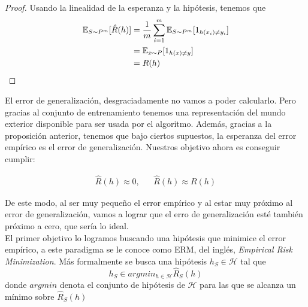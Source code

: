             \begin{proof}
            Usando la linealidad de la esperanza y la hipótesis, tenemos que 
            \begin{equation}
                \begin{aligned}
                    \mathbb{E}_{S \sim P^m} [\hat{R}(h)] & = \frac{1}{m}\sum_{i=1}^m \mathbb{E}_{S \sim P^m}[1_{h(x_i)\neq y_i}]  \\
                     & = \mathbb{E}_{x \sim P}[1_{h(x)\neq y}]  \\
                     & = R(h)
                \end{aligned}
            \end{equation}
            \end{proof}
        
        El error de generalización, desgraciadamente no vamos a poder calcularlo. Pero gracias al conjunto de entrenamiento tenemos una representación del mundo exterior disponible para ser usada por el algoritmo. Además, gracias a la proposición anterior, tenemos que bajo ciertos supuestos, la esperanza del error empírico es el error de generalización. Nuestros objetivo ahora es conseguir cumplir: 
        
        \begin{equation}\label{eq:objetivos_aprendizaje}
            \begin{aligned}
                \hat{R}(h) \approx 0 ,&&    \hat{R}(h) \approx R(h)
            \end{aligned}
        \end{equation}
        
        \noindent De este modo, al ser muy pequeño el error empírico y al estar muy próximo al error de generalización, vamos a lograr que el erro de generalización esté también próximo a cero, que sería lo ideal. \\
        
        
        El primer objetivo lo logramos buscando una hipótesis que minimice el error empírico, a este paradigma se le conoce como ERM, del inglés, \textit{Empirical Risk Minimization}. Más formalmente se busca una hipótesis $h_S \in \mathcal{H}$ tal que 
        \begin{equation}
           h_S \in argmin_{h \in \mathcal{H}} \hat{R}_S(h)
        \end{equation}
        donde $argmin$ denota el conjunto de hipótesis de $\mathcal{H}$ para las que se alcanza un mínimo sobre $\hat{R}_S(h)$ \\
        

